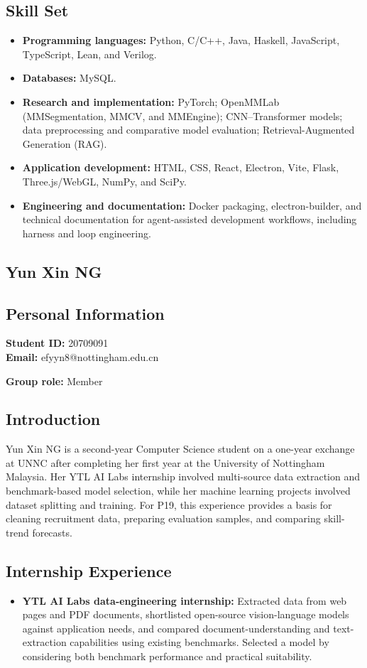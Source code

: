 \documentclass[a4paper,12pt]{article}
\newcommand{\PersonalInformation}[2]{%
  \subsection*{Personal Information}
  \if\relax\detokenize{#1}\relax\else
  \noindent\textbf{Student ID:} #1\\
  \fi
  \textbf{Email:} #2\par
}
\begin{document}
\subsection*{Skill Set}
\begin{itemize}
  \item \textbf{Programming languages:} Python, C/C++, Java, Haskell, JavaScript, TypeScript, Lean, and Verilog.
  \item \textbf{Databases:} MySQL.
  \item \textbf{Research and implementation:} PyTorch; OpenMMLab (MMSegmentation, MMCV, and MMEngine); CNN--Transformer models; data preprocessing and comparative model evaluation; Retrieval-Augmented Generation (RAG).
  \item \textbf{Application development:} HTML, CSS, React, Electron, Vite, Flask, Three.js/WebGL, NumPy, and SciPy.
  \item \textbf{Engineering and documentation:} Docker packaging, electron-builder, and technical documentation for agent-assisted development workflows, including harness and loop engineering.
\end{itemize}

\subsection{Yun Xin NG}
\PersonalInformation{20709091}{efyyn8@nottingham.edu.cn}
\noindent\textbf{Group role:} Member\par

\subsection*{Introduction}
Yun Xin NG is a second-year Computer Science student on a one-year exchange at UNNC after completing her first year at the University of Nottingham Malaysia. Her YTL AI Labs internship involved multi-source data extraction and benchmark-based model selection, while her machine learning projects involved dataset splitting and training. For P19, this experience provides a basis for cleaning recruitment data, preparing evaluation samples, and comparing skill-trend forecasts.

\subsection*{Internship Experience}
\begin{itemize}
  \item \textbf{YTL AI Labs data-engineering internship:} Extracted data from web pages and PDF documents, shortlisted open-source vision-language models against application needs, and compared document-understanding and text-extraction capabilities using existing benchmarks. Selected a model by considering both benchmark performance and practical suitability.
\end{itemize}
\end{document}
